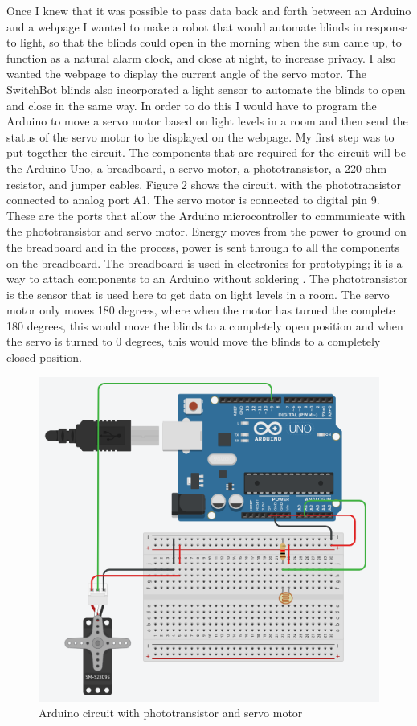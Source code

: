 \documentclass[10pt,twocolumn]{article}
\begin{document}
Once I knew that it was possible to pass data back and forth between an Arduino and a webpage I wanted to make a robot that would automate blinds in response to light, so that the blinds could open in the morning when the sun came up, to function as a natural alarm clock, and close at night, to increase privacy. I also wanted the webpage to display the current angle of the servo motor. The SwitchBot blinds also incorporated a light sensor to automate the blinds to  open and close in the same way. In order to do this I would have to program the Arduino to move a servo motor based on light levels in a room and then send the status of the servo motor to be displayed on the webpage. My first step was to put together the circuit. The components that are required for the circuit will be the Arduino Uno, a breadboard, a servo motor, a phototransistor, a 220-ohm resistor, and jumper cables. Figure 2 shows the circuit, with the phototransistor connected to analog port A1. The servo motor is connected to digital pin 9. These are the ports that allow the Arduino microcontroller to communicate with the phototransistor and servo motor. Energy moves from the power to ground on the breadboard and in the process, power is sent through to all the components on the breadboard. The breadboard is used in electronics for prototyping; it is a way to attach components to an Arduino without soldering \cite{Fitzgerald2015Arduino}. The phototransistor is the sensor that is used here to get data on light levels in a room. The servo motor only moves 180 degrees, where when the motor has turned the complete 180 degrees, this would move the blinds to a completely open position and when the servo is turned to 0 degrees, this would move the blinds to a completely closed position. 

\begin{figure}
    \centering
    \includegraphics[width=.95\linewidth]{Figure 2.png}
    \caption{
        Arduino circuit with phototransistor and servo motor
    }
    \label{fig:fig2}
\end{figure}
\end{document}
